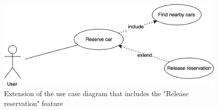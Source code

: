 \begin{figure}[H]
\begin{center}
		\includegraphics[width=\textwidth]{./specific_requirements/features/diagrams/request_car_uc.png}
		\caption{Extension of the use case diagram that includes the "Release reservation" feature}
		\label{request_car_uc}
\end{center}
\end{figure}


